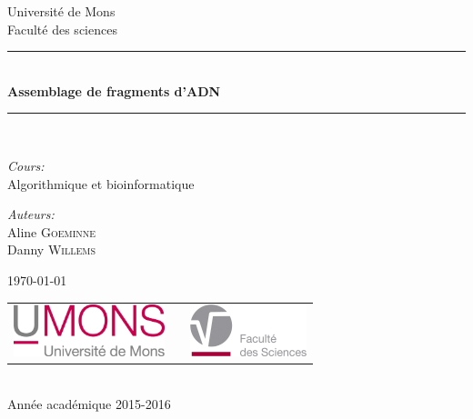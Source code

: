 \documentclass[a4paper, 11pt]{article}
\begin{document}
\begin{titlepage}
\begin{center}

{\Large Université de Mons}\\[1ex]
{\Large Faculté des sciences}\\[2.5cm]

\newcommand{\HRule}{\rule{\linewidth}{0.3mm}}
\HRule \\[0.3cm]
{ \LARGE \bfseries Assemblage de fragments d'ADN \\[0.3cm]}
\HRule \\[1.5cm]

\begin{center}
\emph{Cours:} \\
Algorithmique et bioinformatique
\end{center}

\begin{center}
\emph{Auteurs:} \\
Aline \textsc{Goeminne}\\
Danny \textsc{Willems}
\end{center}
\vfill
\today
\vfill

\begin{center}
\begin{tabular}[t]{c c c}
\includegraphics[height=1.5cm]{umons.jpg} &
\hspace{0.3cm} &
\includegraphics[height=1.5cm]{fac.jpg}
\end{tabular}
\end{center}~\\

{\large Année académique 2015-2016}

\end{center}
\end{titlepage}

\tableofcontents
\newpage







\end{document}
